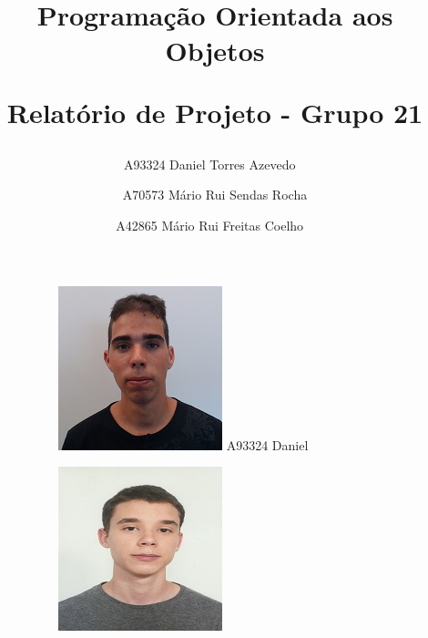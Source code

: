\documentclass[11pt]{article}
\date{\vspace{-5ex}}
\title{Programação Orientada aos Objetos

Relatório de Projeto - Grupo 21}
\author{
	A93324 Daniel Torres Azevedo  \
	\and
	A70573 Mário Rui Sendas Rocha
	\and
	A42865 Mário Rui Freitas Coelho \
}
\begin{document}
\maketitle

\begin{figure}[h!]
	\centering
	\begin{subfigure}[h!]{0.3\linewidth}
		\centering
		\includegraphics[width=\linewidth]{Daniel.jpeg}
		A93324 Daniel
	\end{subfigure}%
	\begin{subfigure}[h!]{0.3\linewidth}
		\centering
		\includegraphics[width=\linewidth]{Mario.jpeg}

\end{subfigure}
\end{figure}
\end{document}
